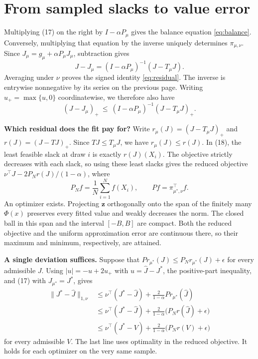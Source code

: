 \documentclass[12pt,a4paper]{article}
\newcommand{\lead}[1]{\par\smallskip\noindent\textbf{#1}\enspace}
\begin{document}
\newpage
\section*{From sampled slacks to value error}
Multiplying (17) on the right by \(I-\alpha P_\mu\) gives the balance
equation \eqref{eq:balance}. Conversely, multiplying that equation by the
inverse uniquely determines \(\pi_{\mu,\nu}\). Since
\(J_\mu=g_\mu+\alpha P_\mu J_\mu\), subtraction gives
\[
 J-J_\mu=(I-\alpha P_\mu)^{-1}(J-T_\mu J).
\]
Averaging under \(\nu\) proves the signed identity \eqref{eq:residual}.
The inverse is entrywise nonnegative by its series on the previous page.
Writing \(u_+=\max\{u,0\}\) coordinatewise, we therefore also have
\[
 (J-J_\mu)_+\ \le\ (I-\alpha P_\mu)^{-1}(J-T_\mu J)_+ .
\]

\lead{Which residual does the fit pay for?}
Write \(r_\mu(J)=(J-T_\mu J)_+\) and \(r(J)=(J-TJ)_+\).
Since \(TJ\le T_\mu J\), we have \(r_\mu(J)\le r(J)\). In (18), the least
feasible slack at draw \(i\) is exactly \(r(J)(X_i)\). The objective strictly
decreases with each slack, so using these least slacks gives the reduced
objective \(\nu^\top J-2P_N r(J)/(1-\alpha)\), where
\[
 P_N f=\frac1N\sum_{i=1}^N f(X_i),\qquad Pf=\pi_{\mu^*,\nu}^\top f .
\]
An optimizer exists. Projecting \(\mathbf z\) orthogonally onto the span of
the finitely many \(\Phi(x)\) preserves every fitted value and weakly decreases
the norm. The closed ball in this span and the interval \([-B,B]\) are
compact. Both the reduced objective and the uniform approximation error
are continuous there, so their maximum and minimum, respectively, are attained.

\lead{A single deviation suffices.}
Suppose that \(P r_{\mu^*}(J)\le P_Nr_{\mu^*}(J)+\epsilon\) for every
admissible \(J\). Using
\(|u|=-u+2u_+\) with \(u=\widehat J-J^*\), the positive-part inequality,
and (17) with \(J_{\mu^*}=J^*\), gives
\begin{align*}
 \|J^*-\widehat J\|_{1,\nu}
 &\le \nu^\top(J^*-\widehat J)+\frac{2}{1-\alpha}P r_{\mu^*}(\widehat J)\\
 &\le \nu^\top(J^*-\widehat J)
        +\frac{2}{1-\alpha}\bigl(P_Nr(\widehat J)+\epsilon\bigr)\\
 &\le \nu^\top(J^*-V)+\frac{2}{1-\alpha}\bigl(P_Nr(V)+\epsilon\bigr)
\end{align*}
for every admissible \(V\). The last line uses optimality in the reduced
objective. It holds for each optimizer on the very same sample.

\newpage
\end{document}
